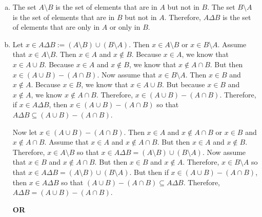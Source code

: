 \documentclass[11pt,letterpaper]{article}
\begin{document}
\sol
\begin{enumerate}[(a)]
\item The set $A \setminus B$ is the set of elements that are in $A$ but not in $B$. The set $B \setminus A$ is the set of elements that are in $B$ but not in $A$. Therefore, $A \Delta B$ is the set of elements that are only in $A$ or only in $B$. 

\item Let $x \in A \Delta B:= (A \setminus B) \cup (B \setminus A)$. Then $x \in A \setminus B$ or $x \in B \setminus A$. Assume that $x \in A \setminus B$. Then $x \in A$ and $x \notin B$. Because $x \in A$, we know that $x \in A \cup B$. Because $x \in A$ and $x \notin B$, we know that $x \notin A \cap B$. But then $x \in (A \cup B) - (A \cap B)$. Now assume that $x \in B \setminus A$. Then $x \in B$ and $x \notin A$. Because $x \in B$, we know that $x \in A \cup B$. But because $x \in B$ and $x \notin A$, we know $x \notin A \cap B$. Therefore, $x \in (A \cup B) - (A \cap B)$. Therefore, if $x \in A \Delta B$, then $x \in (A \cup B) - (A \cap B)$ so that  $A \Delta B \subseteq (A \cup B) - (A \cap B)$. 

Now let $x \in (A \cup B) - (A \cap B)$. Then $x \in A$ and $x \notin A \cap B$ or $x \in B$ and $x \notin A \cap B$. Assume that $x \in A$ and $x \notin A \cap B$. But then $x \in A$ and $x \notin B$. Therefore, $x \in A \setminus B$ so that $x \in A \Delta B= (A \setminus B) \cup (B \setminus A)$. Now assume that $x \in B$ and $x \notin A \cap B$. But then $x \in B$ and $x \notin A$. Therefore, $x \in B \setminus A$ so that $x \in A \Delta B= (A \setminus B) \cup (B \setminus A)$. But then if $x \in (A \cup B) - (A \cap B)$, then $x \in A \Delta B$ so that $(A \cup B) - (A \cap B) \subseteq A \Delta B$. Therefore, $A \Delta B= (A \cup B) - (A \cap B)$. 

\begin{center} {\bfseries OR} \end{center}


\end{enumerate}
\end{document}
